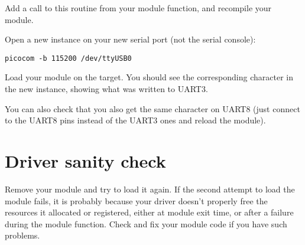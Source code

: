 Add a call to this routine from your module  function,
and recompile your module.

Open a new  instance on your new serial port (not the
serial console):

\begin{verbatim}
picocom -b 115200 /dev/ttyUSB0
\end{verbatim}

Load your module on the target. You should see the
corresponding character in the new  instance,
showing what was written to UART3.

You can also check that you also get the same character on UART8 (just connect
to the UART8 pins instead of the UART3 ones and reload the module).

\section{Driver sanity check}

Remove your module and try to load it again. If the second attempt to
load the module fails, it is probably because your driver doesn't
properly free the resources it allocated or registered, either at module
exit time, or after a failure during the module  function. Check
and fix your module code if you have such problems.
